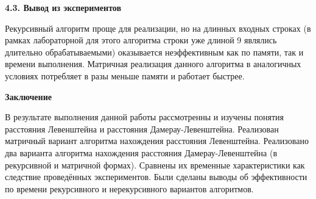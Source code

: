 \documentclass[a4paper,12pt]{report}
\begin{document}
\begin{center}
\begin{flushleft}
 			\newpage
 
        \end{flushleft}
        
        \textbf{4.3. Вывод из экспериментов}
        \begin{flushleft}
        	Рекурсивный алгоритм проще для реализации, но на длинных входных строках (в рамках лабораторной для этого алгоритма строки уже длиной 9 являлись длительно обрабатываемыми) оказывается неэффективным как по памяти, так и времени выполнения. Матричная реализация данного алгоритма в аналогичных условиях потребляет в разы меньше памяти и работает быстрее.
        \end{flushleft}
    \end{center}

    \newpage

    \begin{center}
        \textbf{Заключение}
        \label{sec:conclusion_part}
    \end{center}
        
        	В результате выполнения данной работы рассмотренны и изучены понятия расстояния Левенштейна и расстояния Дамерау-Левенштейна. Реализован матричный вариант алгоритма нахождения расстояния Левенштейна. Реализовано два варианта алгоритма нахождения расстояния Дамерау-Левенштейна (в рекурсивной и матричной формах). Сравнены их временные характеристики как следствие проведённых экспериментов. Были сделаны выводы об эффективности по времени рекурсивного и нерекурсивного вариантов алгоритмов.
       
\end{document}

